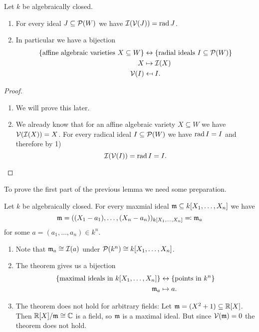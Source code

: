 \begin{prop}
  Let $k$ be algebraically closed.
  \begin{enumerate}[label=\emph{\alph*)},leftmargin=*]
    \item
      For every ideal $J \subseteq \mathcal{P}(W)$ we have $\mathcal{I}(\mathcal{V}(J)) = \operatorname{rad} J$.
    \item
      In particular we have a bijection
      \begin{align*}
        \{\text{affine algebraic varieties $X \subseteq W$}\} &\leftrightarrow \{\text{radial ideals $I \subseteq \mathcal{P}(W)$}\} \\
                        X &\mapsto \mathcal{I}(X) \\
        \mathcal{V}(I) &\mapsfrom I.
    \end{align*}
  \end{enumerate}
\end{prop}
\begin{proof}
  \begin{enumerate}[label=\emph{\alph*)},leftmargin=*]
    \item
      We will prove this later.
    \item
      We already know that for an affine algebraic variety $X \subseteq W$ we have $\mathcal{V}(\mathcal{I}(X)) = X$. For every radical ideal $I \subseteq \mathcal{P}(W)$ we have $\operatorname{rad} I = I$ and therefore by 1)
      \[
        \mathcal{I}(\mathcal{V}(I)) = \operatorname{rad} I = I.
      \]
    \qedhere
  \end{enumerate}
\end{proof}


To prove the first part of the previous lemma we need some preparation.


\begin{thrm}
  Let $k$ be algebraically closed. For every maxmial ideal \mbox{$\mathfrak{m} \subseteq k[X_1, \dotsc, X_n]$} we have
  \[
    \mathfrak{m} = ((X_1 - a_1), \dotsc, (X_n - a_n))_{k[X_1, \dotsc, X_n]} \eqqcolon \mathfrak{m}_a
  \]
  for some $a = (a_1, \dotsc, a_n) \in k^n$.
\end{thrm}


\begin{rem}
  \begin{enumerate}[label=\emph{\alph*)},leftmargin=*]
    \item
      Note that $\mathfrak{m}_{a} \cong \mathcal{I}(a)$ under $\mathcal{P}(k^n) \cong k[X_1, \dotsc, X_n]$.
    \item
      The theorem gives us a bijection
      \begin{align*}
        \{\text{maximal ideals in $k[X_1, \dotsc, X_n]$}\} &\leftrightarrow \{\text{points in $k^n$}\} \\
        \mathfrak{m}_a &\mapsto a.
      \end{align*}
    \item
      The theorem does not hold for arbitrary fields: Let \mbox{$\mathfrak{m} = (X^2 + 1) \subseteq \mathbb{R}[X]$}. Then $\mathbb{R}[X]/\mathfrak{m} \cong \mathbb{C}$ is a field, so $\mathfrak{m}$ is a maximal ideal. But since $\mathcal{V}(\mathfrak{m}) = 0$ the theorem does not hold.
  \end{enumerate}
\end{rem}


